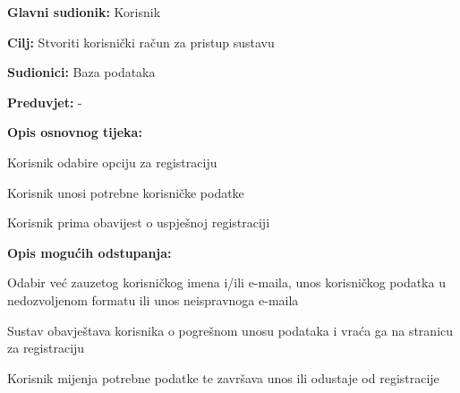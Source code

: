 \noindent {}
\begin{packed_item}
	
	\item \textbf{Glavni sudionik: }Korisnik
	\item  \textbf{Cilj:} Stvoriti korisnički račun za pristup sustavu
	\item  \textbf{Sudionici:} Baza podataka
	\item  \textbf{Preduvjet:} -
	\item  \textbf{Opis osnovnog tijeka:}
	
	\item[] \begin{packed_enum}
		
		\item Korisnik odabire opciju za registraciju
		\item Korisnik unosi potrebne korisničke podatke
		\item Korisnik prima obavijest o uspješnoj registraciji

	\end{packed_enum}
	
	\item  \textbf{Opis mogućih odstupanja:}
	
	\item[] \begin{packed_item}
		
		\item[2.a] Odabir već zauzetog korisničkog imena i/ili e-maila, unos korisničkog podatka u nedozvoljenom formatu ili unos neispravnoga e-maila
		
		\item[] \begin{packed_enum}
			
			\item Sustav obavještava korisnika o pogrešnom unosu podataka i vraća ga na stranicu za registraciju
			\item Korisnik mijenja potrebne podatke te završava unos ili odustaje od registracije
			
		\end{packed_enum}

		
	\end{packed_item}
\end{packed_item}



